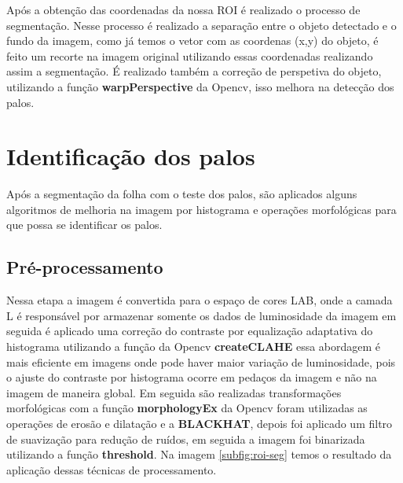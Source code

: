 Após a obtenção das coordenadas da nossa ROI é realizado o processo de segmentação. Nesse processo é realizado a separação entre o objeto detectado e o fundo da imagem, como já temos o vetor com as coordenas (x,y) do objeto, é feito um recorte na imagem original utilizando essas coordenadas realizando assim a segmentação. É realizado também a correção de perspetiva do objeto, utilizando a função \textbf{warpPerspective} da Opencv, isso melhora na detecção dos palos.

\section{Identificação dos palos}
\label{sec:ident-palos}

Após a segmentação da folha com o teste dos palos, são aplicados alguns algoritmos  de melhoria na imagem por histograma e operações morfológicas para que possa se identificar os palos.
\subsection{Pré-processamento}
\label{sec:pre-proce}
Nessa etapa a imagem é convertida para o espaço de cores LAB,  onde a camada L é responsável por armazenar somente os dados de luminosidade da imagem em seguida é aplicado uma correção do contraste por equalização adaptativa do histograma utilizando a função da Opencv \textbf{createCLAHE} essa abordagem é mais eficiente em imagens onde pode haver maior variação de luminosidade, pois o ajuste do contraste por histograma ocorre em pedaços da imagem e não na imagem de maneira global. Em seguida são realizadas  transformações morfológicas  com a função \textbf{morphologyEx} da Opencv foram utilizadas as operações de erosão e dilatação e a \textbf{BLACKHAT}, depois foi aplicado um filtro de suavização  para redução de ruídos, em seguida a imagem foi binarizada utilizando a função \textbf{threshold}.
Na imagem \ref{subfig:roi-seg}  temos o resultado da aplicação dessas técnicas de processamento.

